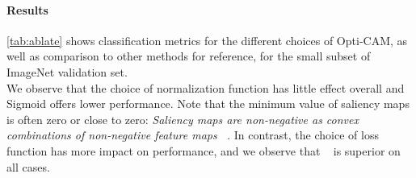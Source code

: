 
\paragraph{Results}

\autoref{tab:ablate} shows classification metrics for the different choices of Opti-CAM, as well as 
comparison to other methods for reference, for the small subset of ImageNet validation set.\\

\noindent We observe that the choice of normalization function has little effect overall and Sigmoid 
offers lower performance. Note that the minimum value of saliency maps is often zero or close to 
zero: \emph{Saliency maps are non-negative as convex combinations of non-negative feature maps
~.} In contrast, the choice of loss function has more impact on performance, and we 
observe that \Fdef~ is superior on all cases.



